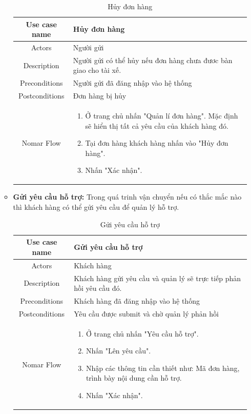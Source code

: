 \begin{itemize}
\begin{itemize}
			
			\begin{table}[!htp]
				\centering\begin{tabular}{|c|m{25em}|}
					\hline 
					Use case name & Hủy đơn hàng\\ 
					\hline 
					Actors & Người gửi \\ 
					\hline
					Description & Người gửi có thể hủy nếu đơn hàng chưa đươc bàn giao cho tài xế. \\
					\hline 
					Preconditions & Người gửi đã đăng nhập vào hệ thống \\
					\hline
					Postconditions & Đơn hàng bị hủy \\
					\hline
					Nomar Flow & \begin{enumerate}
						\item Ở trang chủ nhấn "Quản lí đơn hàng". Mặc định sẽ hiển thị tất cả yêu cầu của khách hàng đó.
						\item Tại đơn hàng khách hàng nhấn vào "Hủy đơn hàng".
						\item Nhấn "Xác nhận".
					\end{enumerate}
					\\
					\hline
				\end{tabular}
				\caption{Hủy đơn hàng}
			\end{table}
		
			\newpage
			
			
			\item \textbf{Gửi yêu cầu hỗ trợ:} Trong quá trinh vận chuyển nếu có thắc mắc nào thì khách hàng có thể gửi yêu cầu để quản lý hỗ trợ.
			
			\begin{table}[!htp]
				\centering\begin{tabular}{|c|m{25em}|}
					\hline 
					Use case name & Gửi yêu cầu hỗ trợ\\ 
					\hline 
					Actors & Khách hàng \\ 
					\hline
					Description & Khách hàng gửi yêu cầu và quản lý sẽ trực tiếp phản hồi yêu cầu đó. \\
					\hline 
					Preconditions & Khách hàng đã đăng nhập vào hệ thống \\
					\hline
					Postconditions & Yêu cầu được submit và chờ quản lý phản hồi \\
					\hline
					Nomar Flow & \begin{enumerate}
						\item Ở trang chủ nhấn "Yêu cầu hỗ trợ".
						\item Nhấn "Lên yêu cầu".
						\item Nhập các thông tin cần thiết như: Mã đơn hàng, trình bày nội dung cần hỗ trợ.
						\item Nhấn "Xác nhận".
					\end{enumerate}
					\\
					\hline
				\end{tabular}
				\caption{Gửi yêu cầu hỗ trợ}
			\end{table}
		

\end{itemize}
\end{itemize}
